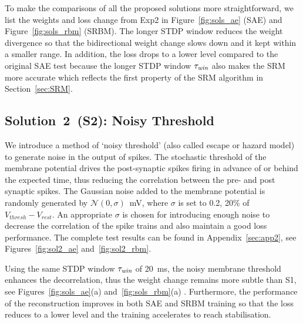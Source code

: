 To make the comparisons of all the proposed solutions more straightforward, we list the weights and loss change from Exp2 in Figure~\ref{fig:sols_ae} (SAE) and Figure~\ref{fig:sols_rbm} (SRBM).
The longer STDP window reduces the weight divergence so that the bidirectional weight change slows down and it kept within a smaller range.
In addition, the loss drops to a lower level compared to the original SAE test because the longer STDP window $\tau_{\textit{\textrm{win}}}$ also makes the SRM more accurate which reflects the first property of the SRM algorithm in Section~\ref{sec:SRM}.



\subsection{Solution~2~(S2): Noisy Threshold}
We introduce a method of `noisy threshold' (also called escape or hazard model)~\citep{gerstner2002spiking} to generate noise in the output of spikes.
The stochastic threshold of the membrane potential drives the post-synaptic spikes firing in advance of or behind the expected time, thus reducing the correlation between the pre- and post synaptic spikes.
The Gaussian noise added to the membrane potential is randomly generated by $\mathcal{N}(0, \sigma)$~mV, where $\sigma$ is set to 0.2, 20\% of $V_{thresh} - V_{rest}.$
An appropriate $\sigma$ is chosen for introducing enough noise to decrease the correlation of the spike trains and also maintain a good loss performance.
The complete test results can be found in Appendix~\ref{sec:app2}, see Figures~\ref{fig:sol2_ae} and~\ref{fig:sol2_rbm}.

Using the same STDP window $\tau_{\textit{\textrm{win}}}$ of 20~ms, the noisy membrane threshold enhances the decorrelation, thus the weight change remains more subtle than S1, see Figures~\ref{fig:sols_ae}(a) and~\ref{fig:sols_rbm}(a) .
Furthermore, the performance of the reconstruction improves in both SAE and SRBM training so that the loss reduces to a lower level and the training accelerates to reach stabilisation. %


